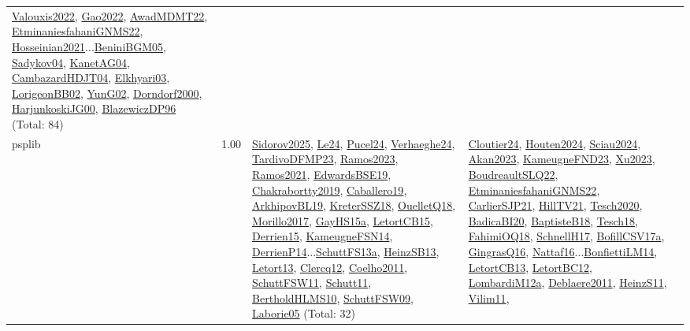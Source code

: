 {\begin{longtable}{p{3cm}r>{\raggedright\arraybackslash}p{6cm}>{\raggedright\arraybackslash}p{6cm}>{\raggedright\arraybackslash}p{8cm}}
\hyperref[detail:Valouxis2022]{Valouxis2022}, \hyperref[detail:Gao2022]{Gao2022}, \hyperref[detail:AwadMDMT22]{AwadMDMT22}, \hyperref[detail:EtminaniesfahaniGNMS22]{EtminaniesfahaniGNMS22}, \hyperref[detail:Hosseinian2021]{Hosseinian2021}...\hyperref[detail:BeniniBGM05]{BeniniBGM05}, \hyperref[detail:Sadykov04]{Sadykov04}, \hyperref[detail:KanetAG04]{KanetAG04}, \hyperref[detail:CambazardHDJT04]{CambazardHDJT04}, \hyperref[detail:Elkhyari03]{Elkhyari03}, \hyperref[detail:LorigeonBB02]{LorigeonBB02}, \hyperref[detail:YunG02]{YunG02}, \hyperref[detail:Dorndorf2000]{Dorndorf2000}, \hyperref[detail:HarjunkoskiJG00]{HarjunkoskiJG00}, \hyperref[detail:BlazewiczDP96]{BlazewiczDP96} (Total: 84)\\
\index{psplib}\index{Classification!psplib}psplib &  1.00 & \hyperref[detail:Sidorov2025]{Sidorov2025}, \hyperref[detail:Le24]{Le24}, \hyperref[detail:Pucel24]{Pucel24}, \hyperref[detail:Verhaeghe24]{Verhaeghe24}, \hyperref[detail:TardivoDFMP23]{TardivoDFMP23}, \hyperref[detail:Ramos2023]{Ramos2023}, \hyperref[detail:Ramos2021]{Ramos2021}, \hyperref[detail:EdwardsBSE19]{EdwardsBSE19}, \hyperref[detail:Chakrabortty2019]{Chakrabortty2019}, \hyperref[detail:Caballero19]{Caballero19}, \hyperref[detail:ArkhipovBL19]{ArkhipovBL19}, \hyperref[detail:KreterSSZ18]{KreterSSZ18}, \hyperref[detail:OuelletQ18]{OuelletQ18}, \hyperref[detail:Morillo2017]{Morillo2017}, \hyperref[detail:GayHS15a]{GayHS15a}, \hyperref[detail:LetortCB15]{LetortCB15}, \hyperref[detail:Derrien15]{Derrien15}, \hyperref[detail:KameugneFSN14]{KameugneFSN14}, \hyperref[detail:DerrienP14]{DerrienP14}...\hyperref[detail:SchuttFS13a]{SchuttFS13a}, \hyperref[detail:HeinzSB13]{HeinzSB13}, \hyperref[detail:Letort13]{Letort13}, \hyperref[detail:Clercq12]{Clercq12}, \hyperref[detail:Coelho2011]{Coelho2011}, \hyperref[detail:SchuttFSW11]{SchuttFSW11}, \hyperref[detail:Schutt11]{Schutt11}, \hyperref[detail:BertholdHLMS10]{BertholdHLMS10}, \hyperref[detail:SchuttFSW09]{SchuttFSW09}, \hyperref[detail:Laborie05]{Laborie05} (Total: 32) & \hyperref[detail:Cloutier24]{Cloutier24}, \hyperref[detail:Houten2024]{Houten2024}, \hyperref[detail:Sciau2024]{Sciau2024}, \hyperref[detail:Akan2023]{Akan2023}, \hyperref[detail:KameugneFND23]{KameugneFND23}, \hyperref[detail:Xu2023]{Xu2023}, \hyperref[detail:BoudreaultSLQ22]{BoudreaultSLQ22}, \hyperref[detail:EtminaniesfahaniGNMS22]{EtminaniesfahaniGNMS22}, \hyperref[detail:CarlierSJP21]{CarlierSJP21}, \hyperref[detail:HillTV21]{HillTV21}, \hyperref[detail:Tesch2020]{Tesch2020}, \hyperref[detail:BadicaBI20]{BadicaBI20}, \hyperref[detail:BaptisteB18]{BaptisteB18}, \hyperref[detail:Tesch18]{Tesch18}, \hyperref[detail:FahimiOQ18]{FahimiOQ18}, \hyperref[detail:SchnellH17]{SchnellH17}, \hyperref[detail:BofillCSV17a]{BofillCSV17a}, \hyperref[detail:GingrasQ16]{GingrasQ16}, \hyperref[detail:Nattaf16]{Nattaf16}...\hyperref[detail:BonfiettiLM14]{BonfiettiLM14}, \hyperref[detail:LetortCB13]{LetortCB13}, \hyperref[detail:LetortBC12]{LetortBC12}, \hyperref[detail:LombardiM12a]{LombardiM12a}, \hyperref[detail:Deblaere2011]{Deblaere2011}, \hyperref[detail:HeinzS11]{HeinzS11}, \hyperref[detail:Vilim11]{Vilim11}, 
\end{longtable}}
